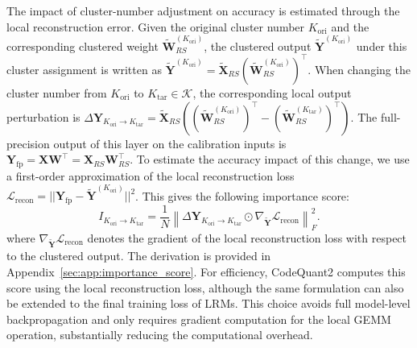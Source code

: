 \documentclass{article}
\begin{document}
The impact of cluster-number adjustment on accuracy is estimated through the local reconstruction error. Given the original cluster number $K_{\mathrm{ori}}$ and the corresponding clustered weight $\widetilde{\mathbf{W}}_{RS}^{(K_{\mathrm{ori}})}$, the clustered output $\widetilde{\mathbf{Y}}^{(K_{\mathrm{ori}})}$ under this cluster assignment is written as
$\widetilde{\mathbf{Y}}^{(K_{\mathrm{ori}})}
=
\widetilde{\mathbf{X}}_{RS}(\widetilde{\mathbf{W}}_{RS}^{(K_{\mathrm{ori}})})^{\top}$.
When changing the cluster number from $K_{\mathrm{ori}}$ to $K_{\mathrm{tar}}\in\mathcal{K}$, the corresponding local output perturbation is
$\Delta\mathbf{Y}_{K_{\mathrm{ori}}\rightarrow K_{\mathrm{tar}}}
=
\widetilde{\mathbf{X}}_{RS}
(
(\widetilde{\mathbf{W}}_{RS}^{(K_{\mathrm{ori}})})^{\top}
-
(\widetilde{\mathbf{W}}_{RS}^{(K_{\mathrm{tar}})})^{\top}
)$.
The full-precision output of this layer on the calibration inputs is $\mathbf{Y}_{\mathrm{fp}}=\mathbf{X}\mathbf{W}^{\top}=\mathbf{X}_{RS}\mathbf{W}_{RS}^{\top}$. To estimate the accuracy impact of this change, we use a first-order approximation of the local reconstruction loss
$\mathcal{L}_{\mathrm{recon}}=||\mathbf{Y}_{\mathrm{fp}}-\widetilde{\mathbf{Y}}^{(K_{\mathrm{ori}})}||^{2}$.
This gives the following importance score:
\begin{equation}
\label{eqn:cluster_assignment}
I_{K_{\mathrm{ori}}\rightarrow K_{\mathrm{tar}}}
=
\frac{1}{N}
\left\|
\Delta\mathbf{Y}_{K_{\mathrm{ori}}\rightarrow K_{\mathrm{tar}}}
\odot
\nabla_{\widetilde{\mathbf{Y}}}
\mathcal{L}_{\mathrm{recon}}
\right\|_F^2.
\end{equation}
where $\nabla_{\widetilde{\mathbf{Y}}}\mathcal{L}_{\mathrm{recon}}$ denotes the gradient of the local reconstruction loss with respect to the clustered output. The derivation is provided in Appendix~\ref{sec:app:importance_score}.
For efficiency, CodeQuant2 computes this score using the local reconstruction loss, although the same formulation can also be extended to the final training loss of LRMs.
This choice avoids full model-level backpropagation and only requires gradient computation for the local GEMM operation, substantially reducing the computational overhead.
\end{document}

